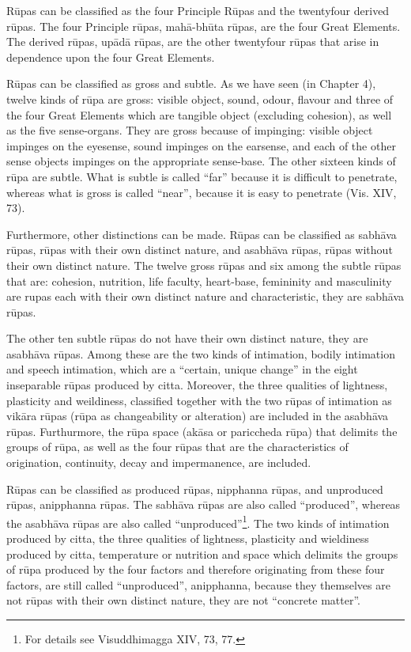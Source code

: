 \documentclass{book}
\begin{document}
R\=upas can be classified as the four Principle R\=upas and the
twentyfour derived r\=upas. The four Principle r\=upas,
mah{\=a}-bh\=uta r\=upas, are the four Great Elements. The derived
r\=upas, up{\=a}d{\=a} r\=upas, are the other twentyfour r\=upas that
arise in dependence upon the four Great Elements. 

R\=upas can be classified as gross and subtle. As we have seen (in
Chapter 4), twelve kinds of r\=upa are gross: visible object, sound,
odour, flavour and three of the four Great Elements which are tangible
object (excluding cohesion), as well as the five sense-organs. They
are gross because of impinging: visible object impinges on the
eyesense, sound impinges on the earsense, and each of the other sense
objects impinges on the appropriate sense-base. The other sixteen
kinds of r\=upa are subtle. What is subtle is called ``far'' because it
is difficult to penetrate, whereas what is gross is called ``near'',
because it is easy to penetrate (Vis. XIV, 73).

Furthermore, other distinctions can be made. R\=upas can be classified
as sabh{\=a}va r\=upas, r\=upas with their own distinct nature, and
asabh{\=a}va r\=upas, r\=upas without their own distinct nature. The
twelve gross r\=upas and six among the subtle r\=upas that are:
cohesion, nutrition, life faculty, heart-base, femininity and
masculinity are rupas each with their own distinct nature and
characteristic, they are sabh{\=a}va r\=upas. 


The other ten subtle r\=upas do not have their own distinct nature, they
are asabh{\=a}va r\=upas. Among these are the two kinds of intimation,
bodily intimation and speech intimation, which are a ``certain, unique
change'' in the eight inseparable r\=upas produced by citta. Moreover, the three qualities of lightness, plasticity and weildiness, classified together with the two r\=upas of intimation as vik\=ara r\=upas (r\=upa as changeability or alteration) are included in the asabh\=ava r\=upas. Furthurmore, the r\=upa space (ak\=asa or pariccheda r\=upa) that delimits the groups of r\=upa, as well as the four r\=upas that are the characteristics of origination, continuity, decay and impermanence, are included.

R\=upas can be classified as produced r\=upas, nipphanna r\=upas, and
unproduced r\=upas, anipphanna r\=upas. The sabh{\=a}va r\=upas are
also called ``produced'', whereas the asabh{\=a}va r\=upas are also
called ``unproduced''\footnote{For details see Visuddhimagga XIV, 73,
77. }. The two kinds of intimation produced by citta, the three
qualities of lightness, plasticity and wieldiness produced by citta,
temperature or nutrition and space which delimits the groups of r\=upa
produced by the four factors and therefore originating from these four
factors, are still called ``unproduced'', anipphanna, because they
themselves are not r\=upas with their own distinct nature, they are not
``concrete matter''. 
\end{document}

